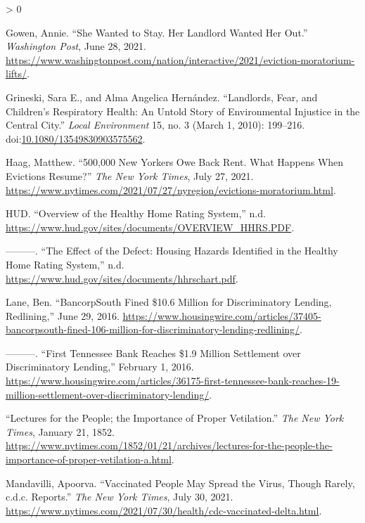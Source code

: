 \documentclass[
  openany]{book}
\newlength{\cslhangindent}
\newenvironment{CSLReferences}[2] %
 {%
  \setlength{\parindent}{0pt}
  \ifodd #1 \everypar{\setlength{\hangindent}{\cslhangindent}}\ignorespaces\fi
  \ifnum #2 > 0
  \setlength{\parskip}{#2\baselineskip}
  \fi
 }%
 {}
\begin{document}
\begin{CSLReferences}{1}{0}
\leavevmode\hypertarget{ref-gowen2021}{}%
Gowen, Annie. {``She Wanted to Stay. Her Landlord Wanted Her Out.''} \emph{Washington Post}, June 28, 2021. \url{https://www.washingtonpost.com/nation/interactive/2021/eviction-moratorium-lifts/}.

\leavevmode\hypertarget{ref-grineski2010}{}%
Grineski, Sara E., and Alma Angelica Hernández. {``Landlords, Fear, and Children's Respiratory Health: An Untold Story of Environmental Injustice in the Central City.''} \emph{Local Environment} 15, no. 3 (March 1, 2010): 199--216. doi:\href{https://doi.org/10.1080/13549830903575562}{10.1080/13549830903575562}.

\leavevmode\hypertarget{ref-haag2021}{}%
Haag, Matthew. {``500,000 New Yorkers Owe Back Rent. What Happens When Evictions Resume?''} \emph{The New York Times}, July 27, 2021. \url{https://www.nytimes.com/2021/07/27/nyregion/evictions-moratorium.html}.

\leavevmode\hypertarget{ref-HHRSover}{}%
HUD. {``Overview of the Healthy Home Rating System,''} n.d. \url{https://www.hud.gov/sites/documents/OVERVIEW_HHRS.PDF}.

\leavevmode\hypertarget{ref-HHRSlst}{}%
---------. {``The Effect of the Defect: Housing Hazards Identified in the Healthy Home Rating System,''} n.d. \url{https://www.hud.gov/sites/documents/hhrschart.pdf}.

\leavevmode\hypertarget{ref-lane2016a}{}%
Lane, Ben. {``BancorpSouth Fined {\$}10.6 Million for Discriminatory Lending, Redlining,''} June 29, 2016. \url{https://www.housingwire.com/articles/37405-bancorpsouth-fined-106-million-for-discriminatory-lending-redlining/}.

\leavevmode\hypertarget{ref-lane2016}{}%
---------. {``First Tennessee Bank Reaches {\$}1.9 Million Settlement over Discriminatory Lending,''} February 1, 2016. \url{https://www.housingwire.com/articles/36175-first-tennessee-bank-reaches-19-million-settlement-over-discriminatory-lending/}.

\leavevmode\hypertarget{ref-lectures1852}{}%
{``Lectures for the People; the Importance of Proper Vetilation.''} \emph{The New York Times}, January 21, 1852. \url{https://www.nytimes.com/1852/01/21/archives/lectures-for-the-people-the-importance-of-proper-vetilation-a.html}.

\leavevmode\hypertarget{ref-mandavilli2021}{}%
Mandavilli, Apoorva. {``Vaccinated People May Spread the Virus, Though Rarely, c.d.c. Reports.''} \emph{The New York Times}, July 30, 2021. \url{https://www.nytimes.com/2021/07/30/health/cdc-vaccinated-delta.html}.


\end{CSLReferences}
\end{document}
